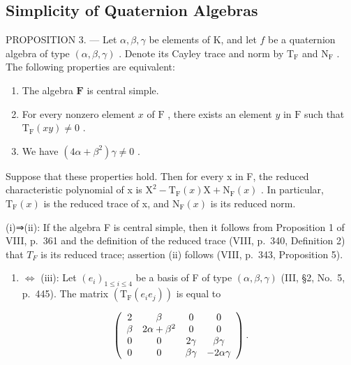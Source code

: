 \subsection{Simplicity of Quaternion Algebras}

PROPOSITION 3. --- Let \(\alpha, \beta, \gamma\) be elements of K, and let \(f\) be a quaternion algebra of type \((\alpha, \beta, \gamma)\) . Denote its Cayley trace and norm by \(\mathrm{T}_{\mathrm{F}}\) and \(\mathrm{N}_{\mathrm{F}}\) . The following properties are equivalent:

\begin{enumerate}
\def\labelenumi{(\roman{enumi})}
\item
  The algebra \(\mathbf{F}\) is central simple.
\item
  For every nonzero element \(x\) of \(\mathrm{F}\) , there exists an element \(y\) in \(\mathrm{F}\) such that \(\mathrm{T}_{\mathrm{F}}(xy) \neq 0\) .
\item
  We have \((4\alpha + \beta^{2})\gamma \neq 0\) .
\end{enumerate}

Suppose that these properties hold. Then for every x in F, the reduced characteristic polynomial of x is \(\mathrm{X}^{2}-\mathrm{T}_{\mathrm{F}}(x)\mathrm{X}+\mathrm{N}_{\mathrm{F}}(x)\) . In particular, \(\mathrm{T}_{\mathrm{F}}(x)\) is the reduced trace of x, and \(\mathrm{N}_{\mathrm{F}}(x)\) is its reduced norm.

(i)⇒(ii): If the algebra F is central simple, then it follows from Proposition 1 of VIII, p.~361 and the definition of the reduced trace (VIII, p.~340, Definition 2) that \(T_{F}\) is its reduced trace; assertion (ii) follows (VIII, p.~343, Proposition 5).

\begin{enumerate}
\def\labelenumi{(\roman{enumi})}
\setcounter{enumi}{1}
\tightlist
\item
  \(\Leftrightarrow\) (iii): Let \((e_i)_{1\leqslant i\leqslant 4}\) be a basis of F of type \((\alpha ,\beta ,\gamma)\) (III, §2, No.~5, p.~445). The matrix \((\mathrm{T_F}(e_i e_j))\) is equal to
\end{enumerate}

\[
\left( \begin{array}{c c c c} 2 & \beta & 0 & 0 \\ \beta & 2 \alpha + \beta^ {2} & 0 & 0 \\ 0 & 0 & 2 \gamma & \beta \gamma \\ 0 & 0 & \beta \gamma & - 2 \alpha \gamma \end{array} \right).
\]

